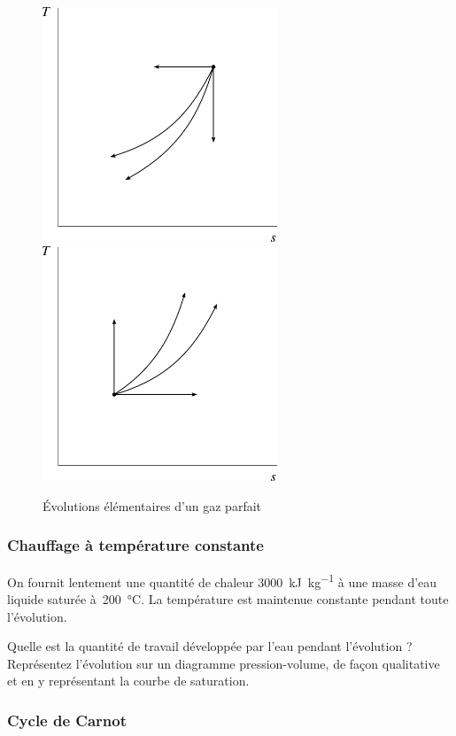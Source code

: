 	\begin{figure}
		\begin{center}
			\includegraphics[width=7cm]{images/exo_ts_elementaires1.png}
			\includegraphics[width=7cm]{images/exo_ts_elementaires2.png}
		\end{center}
		\caption{Évolutions élémentaires d’un gaz parfait}
		\label{fig_tsel}
	\end{figure}


\subsubsection{Chauffage à température constante}

	On fournit lentement une quantité de chaleur \SI{3000}{\kilo\joule\per\kilogram} à une masse d’eau liquide saturée à~\SI{200}{\degreeCelsius}. La température est maintenue constante pendant toute l’évolution.
	
	Quelle est la quantité de travail développée par l’eau pendant l’évolution ? Représentez l’évolution sur un diagramme pression-volume, de façon qualitative et en y représentant la courbe de saturation.
	
\subsubsection{Cycle de Carnot}

